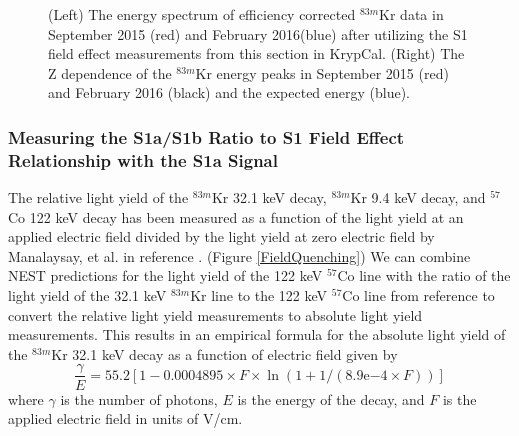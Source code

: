 \documentclass[a4paper,12pt]{article}
\begin{document}
{\begin{figure} [h!]
\centering
{}
\qquad
{}
\caption{ (Left) The energy spectrum of efficiency corrected  $^{83m}$Kr data in September 2015 (red) and February 2016(blue) after utilizing the S1 field effect measurements from this section in KrypCal. (Right) The Z dependence of the $^{83m}$Kr energy peaks in September 2015 (red) and February 2016 (black) and the expected energy (blue).}
\label{ShittyKr}
\end{figure}

\subsubsection{Measuring the S1a/S1b Ratio to S1 Field Effect Relationship with the S1a Signal} \label{MatthewsIdea}

The relative light yield of the $^{83m}$Kr 32.1 keV decay, $^{83m}$Kr 9.4 keV decay, and $^{57}$Co 122 keV decay has been measured as a function of the light yield at an applied electric field divided by the light yield at zero electric field by Manalaysay, et al. in reference \cite{Manalaysay}. (Figure \ref{FieldQuenching})  We can combine NEST predictions for the light yield of the 122 keV $^{57}$Co line with the ratio of the light yield of the 32.1 keV $^{83m}$Kr line to the 122 keV $^{57}$Co line from reference \cite{Manalaysay} to convert the relative light yield measurements to absolute light yield measurements.  This results in an empirical formula for the absolute light yield of the $^{83m}$Kr 32.1 keV decay as a function of electric field given by
\begin{equation}
\frac{\gamma}{E} = 55.2[1-0.0004895 \times F \times \ln{(1 + 1/(8.9\mathrm{e}{-4} \times F))}]
\label{S1aYield}
\end{equation}
where $\gamma$ is the number of photons, $E$ is the energy of the decay, and $F$ is the applied electric field in units of V/cm.  

}
\end{document}
